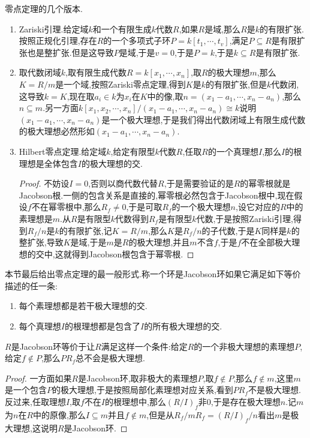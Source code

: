零点定理的几个版本.
\begin{enumerate}
	\item Zariski引理.给定域$k$和一个有限生成$k$代数$R$,如果$R$是域,那么$R$是$k$的有限扩张.按照正规化引理,存在$R$的一个多项式子环$P=k[t_1,\cdots,t_v]$,满足$P\subseteq R$是有限扩张也是整扩张.但是这导致$P$是域,于是$v=0$,于是$P=k$,于是$k\subseteq R$是有限扩张.
	\item 取代数闭域$k$,取有限生成代数$R=k[x_1,\cdots,x_n]$,取$R$的极大理想$m$,那么$K=R/m$是一个域,按照Zariski零点定理,得到$K$是$k$的有限扩张,但是$k$代数闭,这导致$k=K$,现在取$a_i\in k$为$x_i$在$K$中的像,取$n=(x_1-a_1,\cdots,x_n-a_n)$,那么$n\subseteq m$.另一方面$k[x_1,x_2,\cdots,x_n]/(x_1-a_1,\cdots,x_n-a_n)\cong k$说明$(x_1-a_1,\cdots,x_n-a_n)$是一个极大理想,于是我们得出代数闭域上有限生成代数的极大理想必然形如$(x_1-a_1,\cdots,x_n-a_n)$.
	\item Hilbert零点定理.给定域$k$,给定有限型$k$代数$R$,任取$R$的一个真理想$I$,那么$I$的根理想是全体包含$I$的极大理想的交.
	\begin{proof}
		
		不妨设$I=0$,否则以商代数代替$R$,于是需要验证的是$R$的幂零根就是Jacobson根.一侧的包含关系是直接的,幂零根必然包含于Jacobson根中,现在假设$f$不在幂零根中,那么$R_f\not=0$,于是可取$R_f$的一个极大理想$n$,设它对应的$R$中的素理想是$m$.从$R$是有限型$k$代数得到$R_f$是有限型$k$代数,于是按照Zariski引理,得到$R_f/n$是$k$的有限扩张,记$K=R/m$,那么$K$是$R_f/n$的子代数,于是$K$同样是$k$的整扩张,导致$K$是域,于是$m$是$R$的极大理想,并且$m$不含$f$,于是$f$不在全部极大理想的交中,这就得到Jacobson根包含于幂零根.
	\end{proof}
\end{enumerate}

本节最后给出零点定理的最一般形式.称一个环是Jacobson环如果它满足如下等价描述的任一条:
\begin{enumerate}
	\item 每个素理想都是若干极大理想的交.
	\item 每个真理想$I$的根理想都是包含了$I$的所有极大理想的交.
\end{enumerate}

$R$是Jacobson环等价于让$R$满足这样一个条件:给定$R$的一个非极大理想的素理想$P$,给定$f\not\in P$,那么$PR_f$总不会是极大理想.
\begin{proof}
	
	一方面如果$R$是Jacobson环,取非极大的素理想$P$,取$f\not\in P$,那么$f\not\in m$,这里$m$是一个包含$P$的极大理想,于是按照局部化素理想对应关系,看到$PR_f$不是极大理想.反过来,任取理想$I$,取$f$不在$I$的根理想中,那么$(R/I)_f$非0,于是存在极大理想$n$.记$m$为$n$在$R$中的原像,那么$I\subseteq m$并且$f\not\in m$,但是从$R_f/mR_f=(R/I)_f/n$看出$m$是极大理想,这说明$R$是Jacobson环.
\end{proof}

